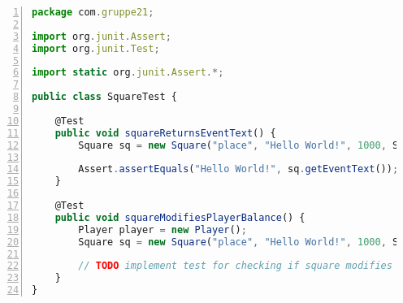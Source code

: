 \begin{lstlisting}[language=JavaScript,numbers=left]
package com.gruppe21;

import org.junit.Assert;
import org.junit.Test;

import static org.junit.Assert.*;

public class SquareTest {

    @Test
    public void squareReturnsEventText() {
        Square sq = new Square("place", "Hello World!", 1000, SquareType.Normal);

        Assert.assertEquals("Hello World!", sq.getEventText());
    }

    @Test
    public void squareModifiesPlayerBalance() {
        Player player = new Player();
        Square sq = new Square("place", "Hello World!", 1000, SquareType.Normal);

        // TODO implement test for checking if square modifies a players bank balance
    }
}

\end{lstlisting}